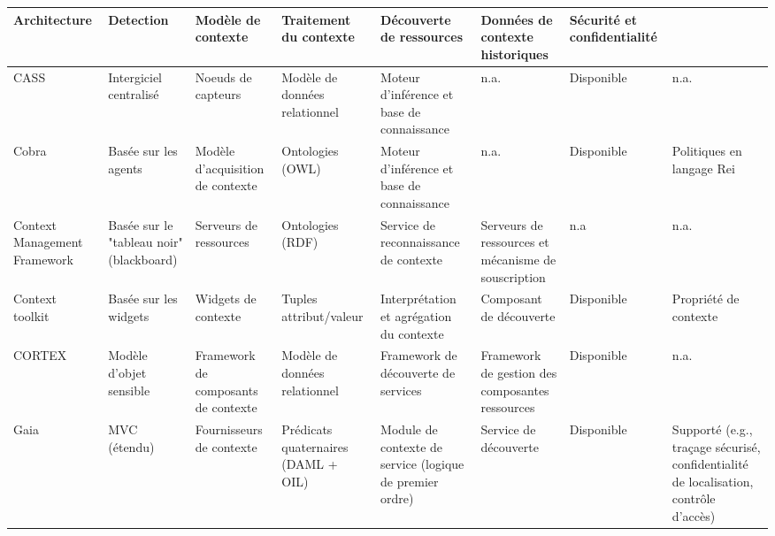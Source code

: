 \begin{table}%
    \tiny
    \begin{tabularx}{\linewidth}{
      >{\raggedright\arraybackslash}X
      >{\raggedright\arraybackslash}X
      >{\raggedright\arraybackslash}X
      >{\raggedright\arraybackslash}X
      >{\raggedright\arraybackslash}X
      >{\raggedright\arraybackslash}X
      >{\raggedright\arraybackslash}X
      >{\raggedright\arraybackslash}X
    }
        \hline
        \textbf{Architecture} & 
        \textbf{Detection} & 
        \textbf{Modèle de contexte} &
        \textbf{Traitement du contexte} &
        \textbf{Découverte de ressources} &
        \textbf{Données de contexte historiques} &
        \textbf{Sécurité et confidentialité} & 
        \\
        \hline
        CASS &
        Intergiciel centralisé &
        Noeuds de capteurs &
        Modèle de données relationnel &
        Moteur d'inférence et base de connaissance &
        n.a. &
        Disponible &
        n.a.\\

        Cobra &
        Basée sur les agents &
        Modèle d'acquisition de contexte &
        Ontologies (OWL) &
        Moteur d'inférence et base de connaissance &
        n.a. &
        Disponible &
        Politiques en langage Rei\\

        Context Management Framework &
        Basée sur le "tableau noir" (blackboard) &
        Serveurs de ressources &
        Ontologies (RDF) &
        Service de reconnaissance de contexte &
        Serveurs de ressources et mécanisme de souscription &
        n.a &
        n.a.\\

        Context toolkit &
        Basée sur les widgets &
        Widgets de contexte &
        Tuples attribut/valeur &
        Interprétation et agrégation du contexte &
        Composant de découverte &
        Disponible &
        Propriété de contexte\\

        CORTEX &
        Modèle d'objet sensible &
        Framework de composants de contexte &
        Modèle de données relationnel &
        Framework de découverte de services &
        Framework de gestion des composantes ressources &
        Disponible &
        n.a.\\

        Gaia &
        MVC (étendu) &
        Fournisseurs de contexte &
        Prédicats quaternaires (DAML + OIL) &
        Module de contexte de service (logique de premier ordre) &
        Service de découverte &
        Disponible &
        Supporté (e.g., traçage sécurisé, confidentialité de localisation,
        contrôle d'accès)\\


\end{tabularx}
\end{table}
